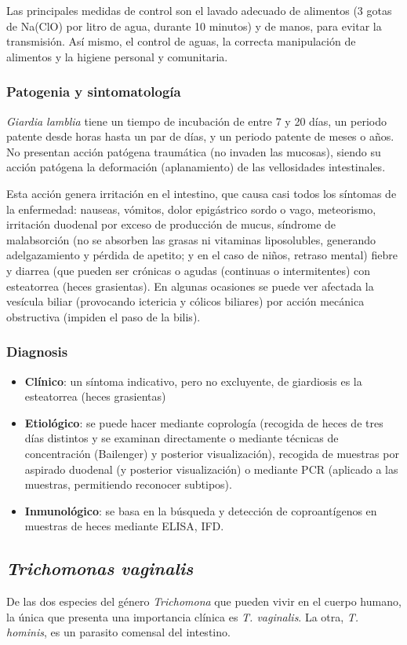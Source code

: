 Las principales medidas de control son el lavado adecuado de alimentos (3 gotas de Na(ClO) por litro de agua, durante 10 minutos) y de manos, para evitar la transmisión. Así mismo, el control de aguas, la correcta manipulación de alimentos y la higiene personal y comunitaria.
\subsubsection{Patogenia y sintomatología}
\textit{Giardia lamblia} tiene un tiempo de incubación de entre 7 y 20 días, un periodo patente desde horas hasta un par de días, y un periodo patente de meses o años. No presentan acción patógena traumática (no invaden las mucosas), siendo su acción patógena la deformación (aplanamiento) de las vellosidades intestinales.

Esta acción genera irritación en el intestino, que causa casi todos los síntomas de la enfermedad: nauseas, vómitos, dolor epigástrico sordo o vago, meteorismo, irritación duodenal por exceso de producción de mucus, síndrome de malabsorción (no se absorben las grasas ni vitaminas liposolubles, generando adelgazamiento y pérdida de apetito; y en el caso de niños, retraso mental) fiebre y diarrea (que pueden ser crónicas o agudas (continuas o intermitentes) con esteatorrea (heces grasientas). En algunas ocasiones se puede ver afectada la vesícula biliar (provocando ictericia y cólicos biliares) por acción mecánica obstructiva (impiden el paso de la bilis).
\subsubsection{Diagnosis}
\begin{itemize}[itemsep=0pt,parsep=0pt,topsep=0pt,partopsep=0pt]
	\item \textbf{Clínico}: un síntoma indicativo, pero no excluyente, de giardiosis es la esteatorrea (heces grasientas)
	\item \textbf{Etiológico}: se puede hacer mediante coprología (recogida de heces de tres días distintos y se examinan directamente o mediante técnicas de concentración (Bailenger) y posterior visualización), recogida de muestras por aspirado duodenal (y posterior visualización) o mediante PCR (aplicado a las muestras, permitiendo reconocer subtipos). 
	\item \textbf{Inmunológico}: se basa en la búsqueda y detección de coproantígenos en muestras de heces mediante ELISA, IFD.
\end{itemize}
\newpage
\subsection{\textit{Trichomonas vaginalis}}
De las dos especies del género \textit{Trichomona} que pueden vivir en el cuerpo humano, la única que presenta una importancia clínica es \textit{T. vaginalis}. La otra, \textit{T. hominis}, es un parasito comensal del intestino.

